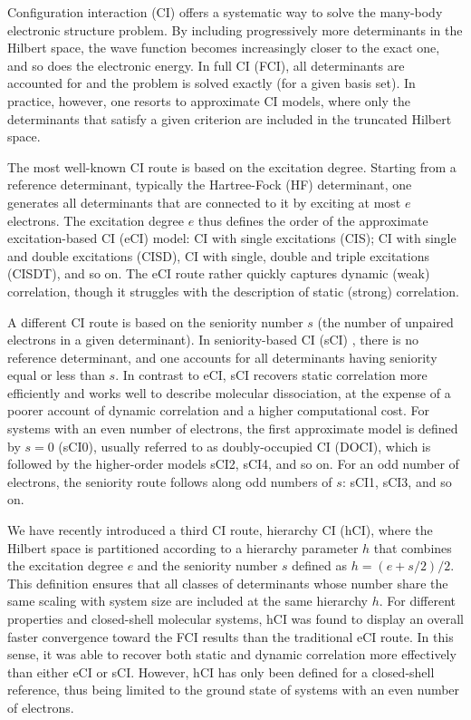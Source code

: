 \documentclass[aip,jcp,reprint,noshowkeys,superscriptaddress]{revtex4-1}
\begin{document}
Configuration interaction (CI) offers a systematic way to solve the many-body electronic structure problem. \cite{SzaboBook,Helgakerbook}
By including progressively more determinants in the Hilbert space, the wave function becomes increasingly closer to the exact one, and so does the electronic energy.
In full CI (FCI), all determinants are accounted for and the problem is solved exactly (for a given basis set).
In practice, however, one resorts to approximate CI models, where only the determinants that satisfy a given criterion are included in the truncated Hilbert space.

The most well-known CI route is based on the excitation degree.
Starting from a reference determinant, typically the Hartree-Fock (HF) determinant,
one generates all determinants that are connected to it by exciting at most $e$ electrons.
The excitation degree $e$ thus defines the order of the approximate excitation-based CI (eCI) model:
CI with single excitations (CIS); CI with single and double excitations (CISD), CI with single, double and triple excitations (CISDT), and so on.
The eCI route rather quickly captures dynamic (weak) correlation, though it struggles with the description of static (strong) correlation.

A different CI route is based on the seniority number $s$ (the number of unpaired electrons in a given determinant).
In seniority-based CI (sCI) \cite{Bytautas_2011,Allen_1962,Smith_1965,Veillard_1967}, there is no reference determinant, and one accounts for all determinants having seniority equal or less than $s$.
In contrast to eCI, sCI recovers static correlation more efficiently and works well to describe molecular dissociation, \cite{Bytautas_2015,Alcoba_2014,Alcoba_2014b}
at the expense of a poorer account of dynamic correlation and a higher computational cost.
For systems with an even number of electrons, the first approximate model is defined by $s=0$ (sCI0), usually referred to as doubly-occupied CI (DOCI),
which is followed by the higher-order models sCI2, sCI4, and so on.
For an odd number of electrons, the seniority route follows along odd numbers of $s$: sCI1, sCI3, and so on.

We have recently introduced a third CI route, hierarchy CI (hCI), \cite{Kossoski_2022}
where the Hilbert space is partitioned according to a hierarchy parameter $h$ that combines the excitation degree $e$ and the seniority number $s$ defined as $h = (e+s/2)/2$.
This definition ensures that all classes of determinants whose number share the same scaling with system size are included at the same hierarchy $h$.
For different properties and closed-shell molecular systems, 
hCI was found to display an overall faster convergence toward the FCI results than the traditional eCI route. \cite{Kossoski_2022}
In this sense, it was able to recover both static and dynamic correlation more effectively than either eCI or sCI.
However, hCI has only been defined for a closed-shell reference, thus being limited to the ground state of systems with an even number of electrons.
\end{document}
